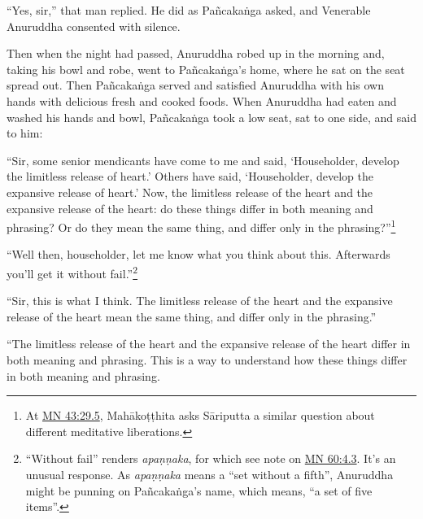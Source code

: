 \documentclass[12pt,openany]{book}%
\begin{document}
“Yes, sir,” that man replied. He did as \textsanskrit{Pañcakaṅga} asked, and Venerable Anuruddha consented with silence. 

Then when the night had passed, Anuruddha robed up in the morning and, taking his bowl and robe, went to \textsanskrit{Pañcakaṅga}’s home, where he sat on the seat spread out. Then \textsanskrit{Pañcakaṅga} served and satisfied Anuruddha with his own hands with delicious fresh and cooked foods. When Anuruddha had eaten and washed his hands and bowl, \textsanskrit{Pañcakaṅga} took a low seat, sat to one side, and said to him: 

“Sir, some senior mendicants have come to me and said, ‘Householder, develop the limitless release of heart.’ Others have said, ‘Householder, develop the expansive release of heart.’ Now, the limitless release of the heart and the expansive release of the heart: do these things differ in both meaning and phrasing? Or do they mean the same thing, and differ only in the phrasing?”\footnote{At \href{https://suttacentral.net/mn43/en/sujato\#29.5}{MN 43:29.5}, \textsanskrit{Mahākoṭṭhita} asks \textsanskrit{Sāriputta} a similar question about different meditative liberations. } 

“Well then, householder, let me know what you think about this. Afterwards you’ll get it without fail.”\footnote{“Without fail” renders \textit{\textsanskrit{apaṇṇaka}}, for which see note on \href{https://suttacentral.net/mn60/en/sujato\#4.3}{MN 60:4.3}. It’s an unusual response. As \textit{\textsanskrit{apaṇṇaka}} means a “set without a fifth”, Anuruddha might be punning on \textsanskrit{Pañcakaṅga}’s name, which means, “a set of five items”. } 

“Sir, this is what I think. The limitless release of the heart and the expansive release of the heart mean the same thing, and differ only in the phrasing.” 

“The limitless release of the heart and the expansive release of the heart differ in both meaning and phrasing. This is a way to understand how these things differ in both meaning and phrasing. 
\end{document}
